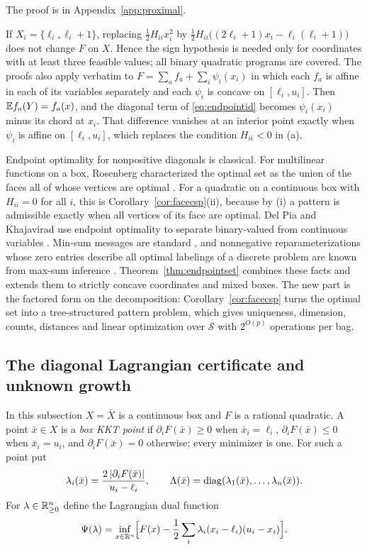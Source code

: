 The proof is in Appendix~\ref{app:proximal}.

\begin{remark}\label{rem:endpointext}
If $X_i=\{\ell_i,\ell_i+1\}$, replacing $\frac12H_{ii}x_i^2$ by
$\frac12H_{ii}\bigl((2\ell_i+1)x_i-\ell_i(\ell_i+1)\bigr)$ does not change $F$
on $X$. Hence the sign hypothesis is needed only for coordinates with at least
three feasible values; all binary quadratic programs are covered. The proofs
also apply verbatim to $F=\sum_af_a+\sum_i\psi_i(x_i)$ in which each $f_a$ is
affine in each of its variables separately and each $\psi_i$ is concave on
$[\ell_i,u_i]$. Then $\mathbb E f_a(Y)=f_a(x)$, and the diagonal term of
\eqref{eq:endpointid} becomes $\psi_i(x_i)$ minus its chord at $x_i$. That
difference vanishes at an interior point exactly when $\psi_i$ is affine on
$[\ell_i,u_i]$, which replaces the condition $H_{ii}<0$ in (a).
\end{remark}

Endpoint optimality for nonpositive diagonals is classical. For multilinear
functions on a box, Rosenberg characterized the optimal set as the union of
the faces all of whose vertices are optimal \cite{Rosenberg1972}. For a
quadratic on a continuous box with $H_{ii}=0$ for all $i$, this is
Corollary~\ref{cor:facecsp}(ii), because by (i) a pattern is admissible
exactly when all vertices of its face are optimal. Del Pia and
Khajavirad use endpoint optimality to separate binary-valued from continuous
variables \cite{DelPiaKhajavirad2026}. Min-sum messages are standard
\cite{Dechter1999}, and nonnegative reparameterizations whose zero entries
describe all optimal labelings of a discrete problem are known from max-sum
inference \cite{WainwrightJaakkolaWillsky2005,Werner2007}.
Theorem~\ref{thm:endpointset} combines these facts and extends them to
strictly concave coordinates and mixed boxes. The new part is the factored
form on the decomposition: Corollary~\ref{cor:facecsp} turns the optimal set
into a tree-structured pattern problem, which gives uniqueness, dimension,
counts, distances and linear optimization over $\mathcal S$ with $2^{O(p)}$
operations per bag.

\subsection{The diagonal Lagrangian certificate and unknown growth}\label{sec:diagcert}

In this subsection $X=\bar X$ is a continuous box and $F$ is a rational
quadratic. A point $\bar x\in X$ is a \emph{box KKT point} if
$\partial_iF(\bar x)\ge0$ when $\bar x_i=\ell_i$, $\partial_iF(\bar x)\le0$
when $\bar x_i=u_i$, and $\partial_iF(\bar x)=0$ otherwise; every minimizer
is one. For such a point put
\[
\lambda_i(\bar x)=\frac{2\,|\partial_iF(\bar x)|}{u_i-\ell_i},\qquad
\Lambda(\bar x)=\operatorname{diag}(\lambda_1(\bar x),\ldots,\lambda_n(\bar x)).
\]
For $\lambda\in\mathbb R^n_{\ge0}$ define the Lagrangian dual function
\[
\Psi(\lambda)=\inf_{x\in\mathbb R^n}\Bigl[F(x)-\frac12\sum_i\lambda_i(x_i-\ell_i)(u_i-x_i)\Bigr].
\]

